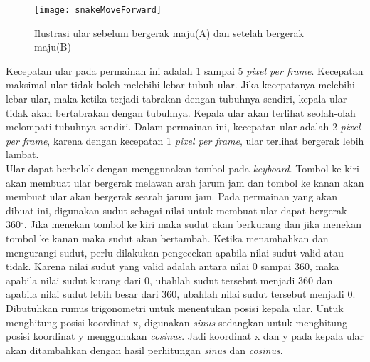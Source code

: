 \begin{figure}[H]
	\centering  
	\texttt{[image: snakeMoveForward]}  
	\caption[Ilustrasi ular sebelum bergerak maju(A) dan setelah bergerak maju(B)]{Ilustrasi ular sebelum bergerak maju(A) dan setelah bergerak maju(B)}
	\label{fig:snakeMoveForward} 
\end{figure}

Kecepatan ular pada permainan ini adalah 1 sampai 5 \textit{pixel per frame}. Kecepatan maksimal ular tidak boleh melebihi lebar tubuh ular. Jika kecepatanya melebihi lebar ular, maka ketika terjadi tabrakan dengan tubuhnya sendiri, kepala ular tidak akan bertabrakan dengan tubuhnya. Kepala ular akan terlihat seolah-olah melompati tubuhnya sendiri. Dalam permainan ini, kecepatan ular adalah 2 \textit{pixel per frame}, karena dengan kecepatan 1 \textit{pixel per frame}, ular terlihat bergerak lebih lambat.\\

Ular dapat berbelok dengan menggunakan tombol pada \textit{keyboard}. Tombol ke kiri akan membuat ular bergerak melawan arah jarum jam dan tombol ke kanan akan membuat ular akan bergerak searah jarum jam. Pada permainan yang akan dibuat ini, digunakan sudut sebagai nilai untuk membuat ular dapat bergerak 360$^\circ$. Jika menekan tombol ke kiri maka sudut akan berkurang dan jika menekan tombol ke kanan maka sudut akan bertambah. Ketika menambahkan dan mengurangi sudut, perlu dilakukan pengecekan apabila nilai sudut valid atau tidak. Karena nilai sudut yang valid adalah antara nilai 0 sampai 360, maka apabila nilai sudut kurang dari 0, ubahlah sudut tersebut menjadi 360 dan apabila nilai sudut lebih besar dari 360, ubahlah nilai sudut tersebut menjadi 0. Dibutuhkan rumus trigonometri untuk menentukan posisi kepala ular. Untuk menghitung posisi koordinat x, digunakan \textit{sinus} sedangkan untuk menghitung posisi koordinat y menggunakan \textit{cosinus}. Jadi koordinat x dan y pada kepala ular akan ditambahkan dengan hasil perhitungan \textit{sinus} dan \textit{cosinus}.

